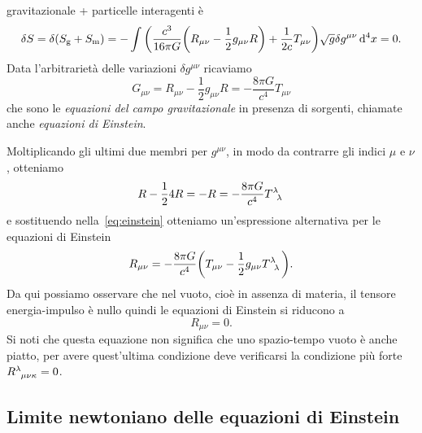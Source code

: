 gravitazionale + particelle interagenti è
\begin{equation}
  \delta S = \delta(S_{\textup{g}} + S_{\textup{m}}) = -\int \bigg(
  \frac{c^{3}}{16\pi G} \bigg( R_{\mu\nu} - \frac{1}{2} g_{\mu\nu} R \bigg) +
  \frac{1}{2c} T_{\mu\nu} \bigg) \sqrt{g} \delta g^{\mu\nu} \mathop{}\!\mathrm{d}^{4} x = 0.
\end{equation}
Data l'arbitrarietà delle variazioni $\delta g^{\mu\nu}$ ricaviamo
\begin{equation}
  \label{eq:einstein}
  G_{\mu\nu} = R_{\mu\nu} - \frac{1}{2} g_{\mu\nu} R = -\frac{8\pi G}{c^{4}}
  T_{\mu\nu}
\end{equation}
che sono le \emph{equazioni del campo gravitazionale} in presenza di sorgenti,
chiamate anche \emph{equazioni di Einstein}.

Moltiplicando gli ultimi due membri per $g^{\mu\nu}$, in modo da contrarre gli
indici $\mu$ e $\nu$, otteniamo
\begin{equation}
  R - \frac{1}{2}4R = -R = -\frac{8\pi G}{c^{4}}\tensor{T}{^{\lambda}_{\lambda}}
\end{equation}
e sostituendo nella~\eqref{eq:einstein} otteniamo un'espressione alternativa per
le equazioni di Einstein
\begin{equation}
  R_{\mu\nu} = -\frac{8\pi G}{c^{4}} \bigg( T_{\mu\nu} -
  \frac{1}{2}g_{\mu\nu}\tensor{T}{^{\lambda}_{\lambda}} \bigg).
\end{equation}
Da qui possiamo osservare che nel vuoto, cioè in assenza di materia, il tensore
energia-impulso è nullo quindi le equazioni di Einstein si riducono a
\begin{equation}
  R_{\mu\nu} = 0.
\end{equation}
Si noti che questa equazione non significa che uno spazio-tempo vuoto è anche
piatto, per avere quest'ultima condizione deve verificarsi la condizione più
forte $\tensor{R}{^{\lambda}_{\mu\nu\kappa}} = 0$.

\subsection{Limite newtoniano delle equazioni di Einstein}
\label{sec:limite-newtoniano-einstein}

